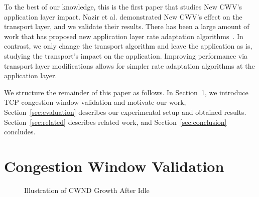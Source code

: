 \documentclass[10pt,sigconf,anonymous]{acmart}
\begin{document}
To the best of our knowledge, this is the first paper that studies New CWV's application layer impact. Nazir et al. \cite{Nazir-2014-performance-evaluation-congestion-window-validation-dash-newcwv} demonstrated New CWV's effect on the transport layer, and we validate their results. There has been a large amount of work that has proposed new application layer rate adaptation algorithms~\cite{Mok-2012-qdash,Huang-2015-A-buffer-based-approach-to-rate-adaptation-bba, Yin-2015-a-control-theoritic-approach}. In contrast, we only change the transport algorithm and leave the application as is, studying the transport's impact on the application. Improving performance via transport layer modifications allows for simpler rate adaptation algorithms at the application layer. %


We structure the remainder of this paper as follows. In Section~\ref{sec:background}, we introduce TCP congestion window validation and motivate our work, Section~\ref{sec:evaluation} describes our experimental setup and obtained results. Section~\ref{sec:related} describes related work, and Section~\ref{sec:conclusion} concludes.

\section{Congestion Window Validation}
\label{sec:background}

\begin{figure}
  \centering
    \caption{Illustration of CWND Growth After Idle}
    \label{fig:cwnd-growth-after-idle}
\end{figure}
\end{document}

